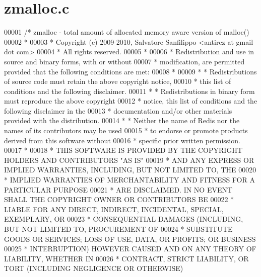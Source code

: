 \hypertarget{zmalloc_8c_source}{}\section{zmalloc.\+c}
\label{zmalloc_8c_source}

\begin{DoxyCode}
00001 \textcolor{comment}{/* zmalloc - total amount of allocated memory aware version of malloc()}
00002 \textcolor{comment}{ *}
00003 \textcolor{comment}{ * Copyright (c) 2009-2010, Salvatore Sanfilippo <antirez at gmail dot com>}
00004 \textcolor{comment}{ * All rights reserved.}
00005 \textcolor{comment}{ *}
00006 \textcolor{comment}{ * Redistribution and use in source and binary forms, with or without}
00007 \textcolor{comment}{ * modification, are permitted provided that the following conditions are met:}
00008 \textcolor{comment}{ *}
00009 \textcolor{comment}{ *   * Redistributions of source code must retain the above copyright notice,}
00010 \textcolor{comment}{ *     this list of conditions and the following disclaimer.}
00011 \textcolor{comment}{ *   * Redistributions in binary form must reproduce the above copyright}
00012 \textcolor{comment}{ *     notice, this list of conditions and the following disclaimer in the}
00013 \textcolor{comment}{ *     documentation and/or other materials provided with the distribution.}
00014 \textcolor{comment}{ *   * Neither the name of Redis nor the names of its contributors may be used}
00015 \textcolor{comment}{ *     to endorse or promote products derived from this software without}
00016 \textcolor{comment}{ *     specific prior written permission.}
00017 \textcolor{comment}{ *}
00018 \textcolor{comment}{ * THIS SOFTWARE IS PROVIDED BY THE COPYRIGHT HOLDERS AND CONTRIBUTORS "AS IS"}
00019 \textcolor{comment}{ * AND ANY EXPRESS OR IMPLIED WARRANTIES, INCLUDING, BUT NOT LIMITED TO, THE}
00020 \textcolor{comment}{ * IMPLIED WARRANTIES OF MERCHANTABILITY AND FITNESS FOR A PARTICULAR PURPOSE}
00021 \textcolor{comment}{ * ARE DISCLAIMED. IN NO EVENT SHALL THE COPYRIGHT OWNER OR CONTRIBUTORS BE}
00022 \textcolor{comment}{ * LIABLE FOR ANY DIRECT, INDIRECT, INCIDENTAL, SPECIAL, EXEMPLARY, OR}
00023 \textcolor{comment}{ * CONSEQUENTIAL DAMAGES (INCLUDING, BUT NOT LIMITED TO, PROCUREMENT OF}
00024 \textcolor{comment}{ * SUBSTITUTE GOODS OR SERVICES; LOSS OF USE, DATA, OR PROFITS; OR BUSINESS}
00025 \textcolor{comment}{ * INTERRUPTION) HOWEVER CAUSED AND ON ANY THEORY OF LIABILITY, WHETHER IN}
00026 \textcolor{comment}{ * CONTRACT, STRICT LIABILITY, OR TORT (INCLUDING NEGLIGENCE OR OTHERWISE)}

\end{DoxyCode}
